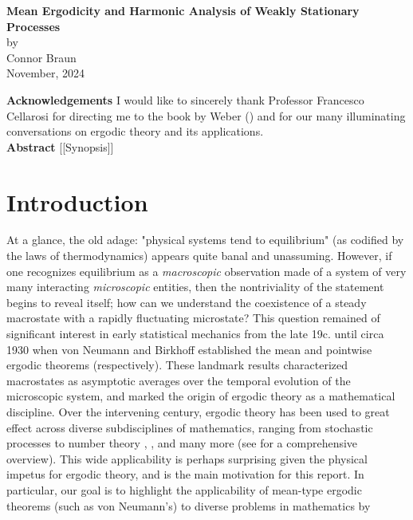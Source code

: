 \documentclass[11pt]{report}
\newcommand{\1}[1]{\mathbbm{1}_{\{#1\}}}
\theoremstyle{definition}
\begin{document}
\thispagestyle{empty}
    \begin{center}
        {\bf\large{Mean Ergodicity and Harmonic Analysis of Weakly Stationary
        Processes}}\\[5pt]
        by\\[5pt]
        Connor Braun\\[5pt]
        November, 2024
    \end{center}
    \vspace{5pt}
    \textbf{Acknowledgements} I would like to sincerely thank Professor Francesco Cellarosi for directing me to
    the book by Weber (\cite{Weber_2000}) and for our many illuminating conversations on ergodic theory and its applications.\\[5pt]
    \textbf{Abstract} [[Synopsis]]
    \section{Introduction}\label{sec0} At a glance, the old adage: "physical systems tend to
    equilibrium" (as codified by the laws of thermodynamics) appears quite banal
    and unassuming. However, if one recognizes equilibrium as a
    \textit{macroscopic} observation made of a system of very many interacting
    \textit{microscopic} entities, then the nontriviality of the statement
    begins to reveal itself; how can we understand the coexistence of a steady
    macrostate with a rapidly fluctuating microstate? This question remained of
    significant interest in early statistical mechanics from the late 19c. until
    circa 1930 when von Neumann \cite{Neumann_1932} and Birkhoff
    \cite{Birkhoff_1931} established the mean and pointwise ergodic theorems
    (respectively). These landmark results characterized macrostates as
    asymptotic averages over the temporal evolution of the microscopic system,
    and marked the origin of ergodic theory as a mathematical discipline. Over
    the intervening century, ergodic theory has been used to great effect across
    diverse subdisciplines of mathematics, ranging from stochastic processes
    \cite[theorem 17.0.1]{Meyn_Tweedie_1993} to number theory
    \cite{Furstenberg_1977}, \cite{Gorodnik_Nevo_2015}, \cite{Green_Tao_2008}
    and many more (see \cite{Eisner_Farkas_Haase_Nagel_2015} for a comprehensive
    overview). This wide applicability is perhaps surprising given the physical
    impetus for ergodic theory, and is the main motivation for this report. In
    particular, our goal is to highlight the applicability of mean-type ergodic
    theorems (such as von Neumann's) to diverse problems in mathematics by
\end{document}
